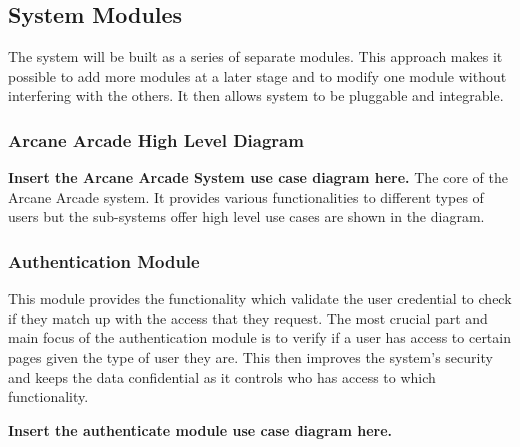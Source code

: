 \documentclass[english]{article}
\begin{document}
		\subsection{System Modules}
		The system will be built as a series of separate modules. This approach makes it possible to add more modules at a later stage and to modify one module without interfering with the others. It then allows system to be pluggable and integrable.
		\subsubsection{Arcane Arcade High Level Diagram}
		\textbf{Insert the Arcane Arcade System use case diagram here.} \newline
		The core of the Arcane Arcade system. It provides various functionalities to different types of users but the sub-systems offer high level use cases are shown in the diagram.
		\subsubsection{Authentication Module}
		This module provides the functionality which validate the user credential to check if they match up with the access that they request. The most crucial part and main focus of the authentication module is to verify if a user has access to certain pages given the type of user they are. This then improves the system's security and keeps the data confidential as it controls who has access to which functionality.
		
		\textbf{Insert the authenticate module use case diagram here.} \newline
\end{document}
